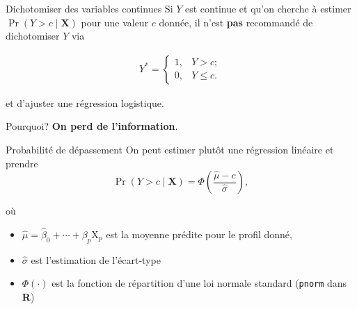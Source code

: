\documentclass[
  ignorenonframetext,
]{beamer}
\providecommand{\tightlist}{%
  \setlength{\itemsep}{0pt}\setlength{\parskip}{0pt}}\usepackage{longtable,booktabs,array}
\begin{document}
\begin{frame}{Dichotomiser des variables continues}
\protect\hypertarget{dichotomiser-des-variables-continues}{}
Si \(Y\) est continue et qu'on cherche à estimer
\(\Pr(Y> c \mid \mathbf{X})\) pour une valeur \(c\) donnée, il n'est
\textbf{pas} recommandé de dichotomiser \(Y\) via

\begin{align*}
Y^{*} = \begin{cases}
1, & Y > c; \\
0, & Y \leq c.
\end{cases}
\end{align*}

et d'ajuster une régression logistique.

Pourquoi? \textbf{On perd de l'information}.
\end{frame}

\begin{frame}[fragile]{Probabilité de dépassement}
\protect\hypertarget{probabilituxe9-de-duxe9passement}{}
On peut estimer plutôt une régression linéaire et prendre
\[\Pr(Y > c \mid \mathbf{X}) = \Phi\left(\frac{\widehat{\mu}-c}{\widehat{\sigma}}\right),\]

où

\begin{itemize}
\tightlist
\item
  \(\widehat{\mu}=\widehat{\beta}_0 + \cdots + \beta_p\mathrm{X}_p\) est
  la moyenne prédite pour le profil donné,
\item
  \(\widehat{\sigma}\) est l'estimation de l'écart-type
\item
  \(\Phi(\cdot)\) est la fonction de répartition d'une loi normale
  standard (\texttt{pnorm} dans \textbf{R})
\end{itemize}
\end{frame}
\end{document}

